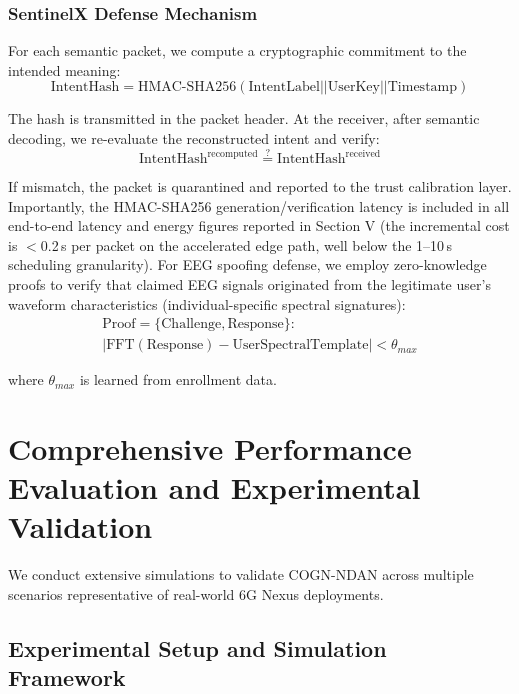 \documentclass{BVP_CINC}
\newcommand{\COGN}{COGN-NDAN}
\begin{document}
\subsubsection{SentinelX Defense Mechanism}
For each semantic packet, we compute a cryptographic commitment to the intended meaning:
\begin{equation}
    \text{IntentHash} = \text{HMAC-SHA256}(\text{IntentLabel} || \text{UserKey} || \text{Timestamp})
\end{equation}

The hash is transmitted in the packet header. At the receiver, after semantic decoding, we re-evaluate the reconstructed intent and verify:
\begin{equation}
    \text{IntentHash}^{\text{recomputed}} \stackrel{?}{=} \text{IntentHash}^{\text{received}}
\end{equation}

If mismatch, the packet is quarantined and reported to the trust calibration layer. Importantly, the HMAC-SHA256 generation/verification latency is included in all end-to-end latency and energy figures reported in Section V (the incremental cost is $<$0.2\,\textmu s per packet on the accelerated edge path, well below the 1--10\,\textmu s scheduling granularity). For EEG spoofing defense, we employ zero-knowledge proofs to verify that claimed EEG signals originated from the legitimate user's waveform characteristics (individual-specific spectral signatures):
\begin{equation}
\begin{aligned}
\text{Proof} = \{\text{Challenge}, \text{Response}\}:\\
|\text{FFT}(\text{Response}) - \text{UserSpectralTemplate}| < \theta_{max}
\end{aligned}
\end{equation}

where $\theta_{max}$ is learned from enrollment data.

\section{Comprehensive Performance Evaluation and Experimental Validation}

We conduct extensive simulations to validate \COGN{} across multiple scenarios representative of real-world 6G Nexus deployments.

\subsection{Experimental Setup and Simulation Framework}
\end{document}
